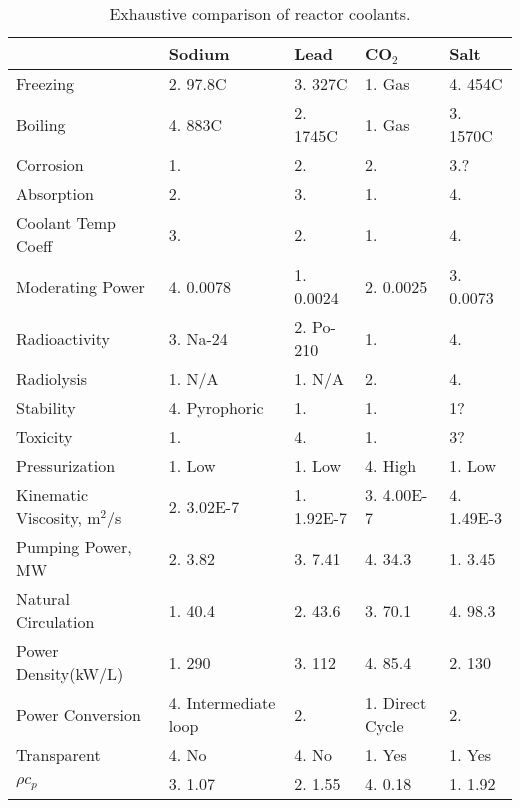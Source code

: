 \documentclass[]{report}
\begin{document}
\begin{table}[ht]
\begin{tabular}{l|l|l|l|l|}
          & Sodium & Lead & CO$_2$ & Salt\\
  \hline
  Freezing & 2. 97.8C & 3. 327C & 1. Gas & 4. 454C\\ %
  Boiling & 4. 883C & 2. 1745C & 1. Gas & 3. 1570C\\ %
  Corrosion & 1. & 2. & 2. & 3.? \\
  Absorption & 2. & 3. & 1. & 4. \\
  Coolant Temp Coeff & 3. & 2. & 1. & 4.\\
  Moderating Power & 4. 0.0078 & 1. 0.0024 & 2. 0.0025 & 3. 0.0073\\
  Radioactivity & 3. Na-24 & 2. Po-210 & 1. & 4. \\
  Radiolysis & 1. N/A & 1. N/A & 2. & 4. \\
  Stability & 4. Pyrophoric & 1. & 1. & 1? \\
  Toxicity & 1. & 4. & 1. & 3? \\
  Pressurization & 1. Low & 1. Low & 4. High & 1. Low \\
  Kinematic Viscosity, m$^2$/s & 2. 3.02E-7 & 1. 1.92E-7 & 3. 4.00E-7 & 4. 1.49E-3 \\ 
  Pumping Power, MW \cite{coolant_comparison} & 2. 3.82 & 3. 7.41 & 4. 34.3 & 1. 3.45 \\
  Natural Circulation \cite{coolant_comparison} & 1. 40.4 & 2. 43.6 & 3. 70.1 & 4. 98.3 \\
  Power Density(kW/L) & 1. 290 & 3. 112  & 4. 85.4 & 2. 130 \\
  Power Conversion & 4. Intermediate loop & 2. & 1. Direct Cycle & 2. \\
  Transparent & 4. No & 4. No & 1. Yes & 1. Yes\\
  $\rho c_p$ & 3. 1.07 & 2. 1.55 & 4. 0.18 & 1. 1.92\\   %
\end{tabular}
\caption{Exhaustive comparison of reactor coolants.\cite{coolant_comparison}}
\end{table}








\end{document}
